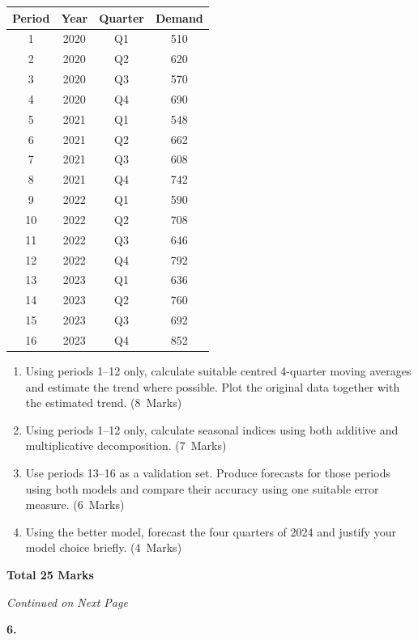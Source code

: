 \documentclass[11pt,a4paper]{article}
\newcommand{\continuednotice}{%
    \vfill
    \begin{center}
    \textit{Continued on Next Page}
    \end{center}
    \newpage
}
\newcommand{\markalloc}[1]{\nobreak\hfill\mbox{(#1 Marks)}}
\newcommand{\questiontotal}[1]{\begin{flushright}\textbf{Total #1 Marks}\end{flushright}}
\begin{document}
\begin{center}
\begin{tabular}{cccc}
\toprule
Period & Year & Quarter & Demand \\
\midrule
1  & 2020 & Q1 & 510 \\
2  & 2020 & Q2 & 620 \\
3  & 2020 & Q3 & 570 \\
4  & 2020 & Q4 & 690 \\
5  & 2021 & Q1 & 548 \\
6  & 2021 & Q2 & 662 \\
7  & 2021 & Q3 & 608 \\
8  & 2021 & Q4 & 742 \\
9  & 2022 & Q1 & 590 \\
10 & 2022 & Q2 & 708 \\
11 & 2022 & Q3 & 646 \\
12 & 2022 & Q4 & 792 \\
13 & 2023 & Q1 & 636 \\
14 & 2023 & Q2 & 760 \\
15 & 2023 & Q3 & 692 \\
16 & 2023 & Q4 & 852 \\
\bottomrule
\end{tabular}
\end{center}

\begin{enumerate}
\item Using periods 1--12 only, calculate suitable centred 4-quarter moving averages and estimate the trend where possible. Plot the original data together with the estimated trend. \markalloc{8}

\item Using periods 1--12 only, calculate seasonal indices using both additive and multiplicative decomposition. \markalloc{7}

\item Use periods 13--16 as a validation set. Produce forecasts for those periods using both models and compare their accuracy using one suitable error measure. \markalloc{6}

\item Using the better model, forecast the four quarters of 2024 and justify your model choice briefly. \markalloc{4}
\end{enumerate}

\questiontotal{25}

\continuednotice

\textbf{6.}
\end{document}
